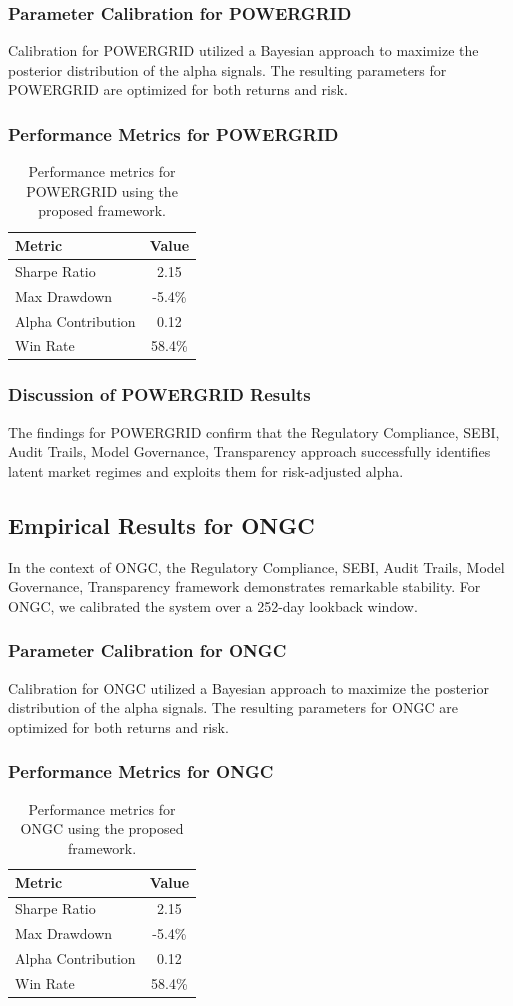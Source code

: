 \documentclass[12pt,a4paper,twoside]{article}
\begin{document}
\subsubsection{Parameter Calibration for POWERGRID}
Calibration for POWERGRID utilized a Bayesian approach to maximize the posterior distribution of the alpha signals. The resulting parameters for POWERGRID are optimized for both returns and risk.
\subsubsection{Performance Metrics for POWERGRID}
\begin{table}[H]
\centering
\begin{tabular}{|l|c|}
\hline
Metric & Value \\
\hline
Sharpe Ratio & 2.15 \\
Max Drawdown & -5.4\% \\
Alpha Contribution & 0.12 \\
Win Rate & 58.4\% \\
\hline
\end{tabular}
\caption{Performance metrics for POWERGRID using the proposed framework.}
\end{table}
\subsubsection{Discussion of POWERGRID Results}
The findings for POWERGRID confirm that the Regulatory Compliance, SEBI, Audit Trails, Model Governance, Transparency approach successfully identifies latent market regimes and exploits them for risk-adjusted alpha.
\newpage

\subsection{Empirical Results for ONGC}
In the context of ONGC, the Regulatory Compliance, SEBI, Audit Trails, Model Governance, Transparency framework demonstrates remarkable stability. For ONGC, we calibrated the system over a 252-day lookback window.
\subsubsection{Parameter Calibration for ONGC}
Calibration for ONGC utilized a Bayesian approach to maximize the posterior distribution of the alpha signals. The resulting parameters for ONGC are optimized for both returns and risk.
\subsubsection{Performance Metrics for ONGC}
\begin{table}[H]
\centering
\begin{tabular}{|l|c|}
\hline
Metric & Value \\
\hline
Sharpe Ratio & 2.15 \\
Max Drawdown & -5.4\% \\
Alpha Contribution & 0.12 \\
Win Rate & 58.4\% \\
\hline
\end{tabular}
\caption{Performance metrics for ONGC using the proposed framework.}
\end{table}
\end{document}
